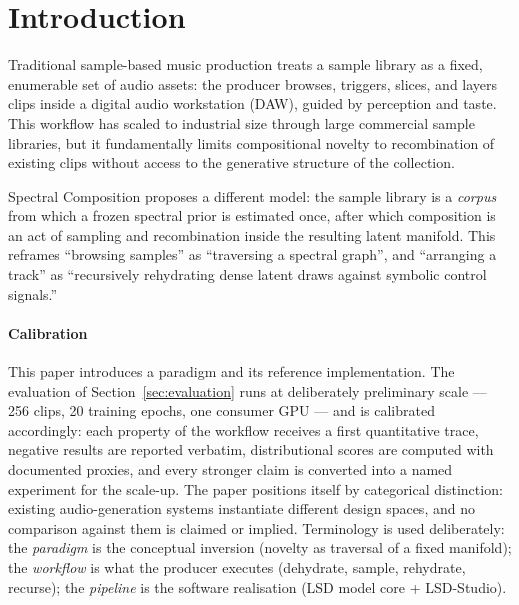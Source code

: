 \documentclass[12pt,a4paper]{article}
\begin{document}
\tableofcontents
\newpage


\section{Introduction}
\label{sec:intro}

Traditional sample-based music production treats a sample library as a
fixed, enumerable set of audio assets: the producer browses, triggers,
slices, and layers clips inside a digital audio workstation (DAW), guided
by perception and taste. This workflow has scaled to industrial size
through large commercial sample libraries, but it fundamentally limits
compositional novelty to recombination of existing clips without access
to the generative structure of the collection.

Spectral Composition proposes a different model: the sample library is a
\emph{corpus} from which a frozen spectral prior is estimated once, after
which composition is an act of sampling and recombination inside the
resulting latent manifold. This reframes ``browsing samples'' as
``traversing a spectral graph'', and ``arranging a track'' as
``recursively rehydrating dense latent draws against symbolic control
signals.''

\paragraph{Calibration}
This paper introduces a paradigm and its reference implementation.
The evaluation of Section~\ref{sec:evaluation} runs at
deliberately preliminary scale --- 256 clips, 20 training epochs, one
consumer GPU --- and is calibrated accordingly: each property of the
workflow receives a first quantitative trace, negative results are
reported verbatim, distributional scores are computed with documented
proxies, and every stronger claim is converted into a named experiment
for the scale-up. The paper positions itself by categorical
distinction: existing audio-generation systems instantiate different
design spaces, and no comparison against them is claimed or implied.
Terminology is used deliberately: the \emph{paradigm} is the conceptual
inversion (novelty as traversal of a fixed manifold); the
\emph{workflow} is what the producer executes (dehydrate, sample,
rehydrate, recurse); the \emph{pipeline} is the software realisation
(LSD model core + LSD-Studio).
\end{document}
